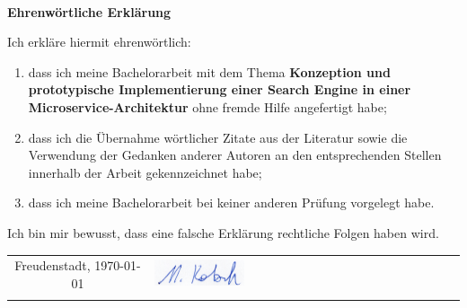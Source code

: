 
~

\vspace{17.1mm}

\begin{flushleft}
    \textbf{\huge{}Ehrenwörtliche Erklärung}{\huge\par}
\par\end{flushleft}

Ich erkläre hiermit ehrenwörtlich:

\begin{enumerate}
    \item dass ich meine Bachelorarbeit mit dem Thema \textbf{\glqq Konzeption und prototypische Implementierung einer Search Engine in einer Microservice-Architektur\grqq{}} ohne fremde Hilfe angefertigt habe;
    \item dass ich die Übernahme wörtlicher Zitate aus der Literatur sowie die Verwendung der Gedanken anderer Autoren an den entsprechenden Stellen innerhalb der Arbeit gekennzeichnet habe;
    \item dass ich meine Bachelorarbeit bei keiner anderen Prüfung vorgelegt habe.
\end{enumerate}

Ich bin mir bewusst, dass eine falsche Erklärung rechtliche Folgen haben wird.

\vspace{2cm}

\begin{center}
    \begin{tabular*}{\textwidth}{@{\extracolsep{\fill}}cl}
        Freudenstadt, \today & \includegraphics[width=0.3\textwidth]{images/Unterschrift.png}
        \tabularnewline
        & \author{}
        \tabularnewline
    \end{tabular*}
    \par
\end{center}